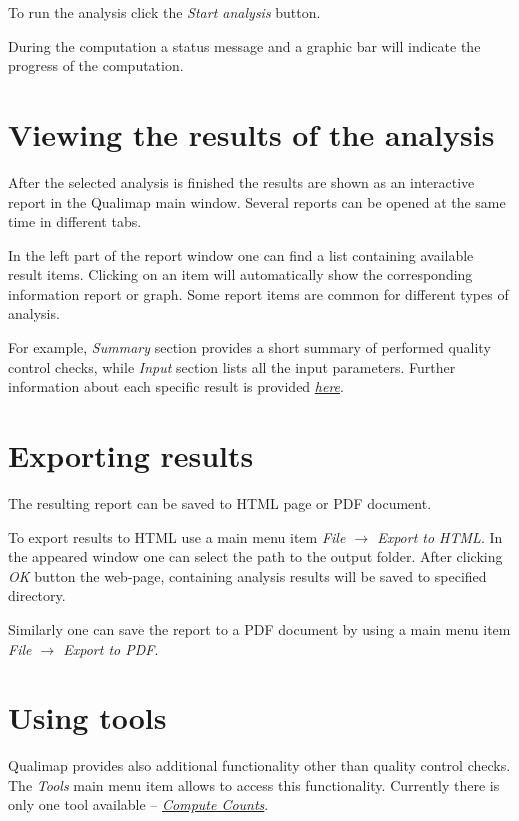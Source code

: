 \documentclass[a4paper,10pt,english]{sphinxmanual}
\begin{document}
To run the analysis click the \emph{Start analysis} button.

During the computation a status message and a graphic bar will indicate the progress of the computation.


\section{Viewing the results of the analysis}
\label{workflow:viewing-the-results-of-the-analysis}
After the selected analysis is finished the results are shown as an interactive report in the Qualimap main window. Several reports can be opened at the same time in different tabs.

In the left part of the report window one can find a list containing available result items. Clicking on an item will automatically show the corresponding information report or graph. Some report items are common for different types of analysis.

For example, \emph{Summary} section provides a short summary of performed quality control checks, while \emph{Input} section lists all the input parameters. Further information about each specific result is provided {\hyperref[analysis:analysis-types]{\emph{here}}}.


\section{Exporting results}
\label{workflow:exporting-results}
The resulting report can be saved to HTML page or PDF document.

To export results to HTML use a main menu item \emph{File \(\rightarrow\) Export to HTML}. In the appeared window one can select the path to the output folder. After clicking \emph{OK} button the web-page, containing analysis results will be saved to specified directory.

Similarly one can save the report to a PDF document by using a main menu item \emph{File \(\rightarrow\) Export to PDF}.


\section{Using tools}
\label{workflow:using-tools}
Qualimap provides also additional functionality other than quality control checks. The \emph{Tools} main menu item allows to access this functionality. Currently there is only one tool available -- {\hyperref[analysis:compute-counts]{\emph{Compute Counts}}}.
\end{document}
